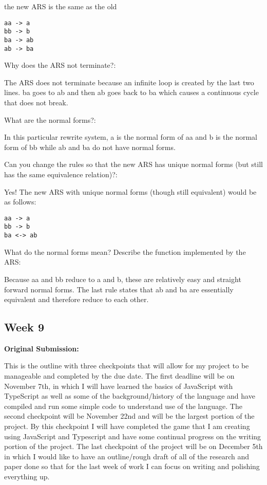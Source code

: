 \documentclass{article}
\theoremstyle{theorem}
\theoremstyle{definition}
\theoremstyle{remark}
\begin{document}
the new ARS is the same as the old

\begin{lstlisting}
aa -> a
bb -> b
ba -> ab
ab -> ba
\end{lstlisting}
\medskip\noindent
Why does the ARS not terminate?:

\medskip\noindent
The ARS does not terminate because an infinite loop is created by the last two lines. ba goes to ab and then ab goes back to ba which causes a continuous cycle that does not break.

\medskip\noindent
What are the normal forms?:

\medskip\noindent
In this particular rewrite system, a is the normal form of aa and b is the normal form of bb while ab and ba do not have normal forms.

\medskip\noindent
Can you change the rules so that the new ARS has unique normal forms (but still has the same equivalence relation)?:

\medskip\noindent
Yes! The new ARS with unique normal forms (though still equivalent) would be as follows:

\begin{lstlisting}
aa -> a
bb -> b
ba <-> ab
\end{lstlisting}


\medskip\noindent
What do the normal forms mean? Describe the function implemented by the ARS:

\medskip\noindent
Because aa and bb reduce to a and b, these are relatively easy and straight forward normal forms. The last rule states that ab and ba are essentially equivalent and therefore reduce to each other.

\subsection{Week 9}

\medskip\noindent
\textbf{Original Submission:}

This is the outline with three checkpoints that will allow for my project to be manageable and completed by the due date. The first deadline will be on November 7th, in which I will have learned the basics of JavaScript with TypeScript as well as some of the background/history of the language and have compiled and run some simple code to understand use of the language. The second checkpoint will be November 22nd and will be the largest portion of the project. By this checkpoint I will have completed the game that I am creating using JavaScript and Typescript and have some continual progress on the writing portion of the project. The last checkpoint of the project will be on December 5th in which I would like to have an outline/rough draft of all of the research and paper done so that for the last week of work I can focus on writing and polishing everything up.
\end{document}
